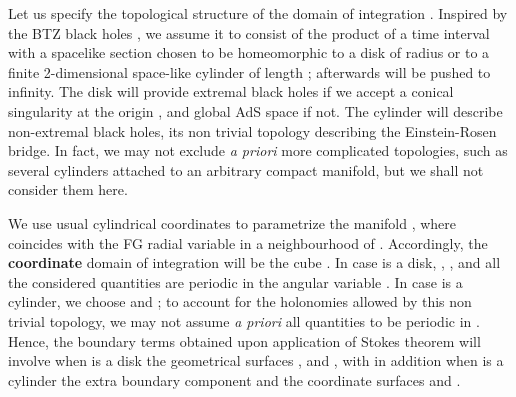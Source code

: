 \documentclass[a4paper,10pt]{article}
\begin{document}
Let us specify the topological structure of the domain of integration \coordHE{}. 
Inspired by the BTZ black holes \cite{BTZ}, we assume it to consist 
of the product of a time interval \myHighlight{$[t_0,\, t_1]$}\coordHE{} with a spacelike 
section \myHighlight{$\Sigma$}\coordHE{} chosen to be homeomorphic to a disk of radius 
\coordHE{} or to a finite 2-dimensional space-like cylinder of length  
\coordHE{}; afterwards \coordHE{} will be pushed to infinity.  
The disk will provide extremal black 
holes if we accept a conical singularity at the 
origin \coordHE{}, and global AdS space if not.  
The cylinder will describe  non-extremal black holes, its 
non trivial topology describing 
the Einstein-Rosen bridge. In fact, we may not 
exclude {\it a priori} 
more complicated topologies, such as several cylinders attached to 
an arbitrary compact manifold, but we shall not consider them here. 
 
We use usual cylindrical coordinates \coordHE{}  
to parametrize the manifold \coordHE{}, where \coordHE{} coincides with the FG  
radial variable in a neighbourhood of \coordHE{}. 
Accordingly, the {\bf coordinate} 
domain of integration will be the cube \coordHE{}.  
In case \myHighlight{$\Sigma$}\coordHE{} is a disk, \coordHE{}, \coordHE{},  
and all the considered quantities 
are periodic in the angular variable \myHighlight{$\varphi$}\coordHE{}.  
In case \myHighlight{$\Sigma$}\coordHE{} is a cylinder, we choose  \coordHE{} and \coordHE{};  
to account for the holonomies allowed by this non trivial 
topology, we may not assume {\it a priori} all quantities  
to be periodic in \myHighlight{$\varphi$}\coordHE{}. Hence, the boundary terms obtained upon  
application of Stokes theorem will involve when \myHighlight{$\Sigma$}\coordHE{} is a disk  
the geometrical surfaces \coordHE{}, \coordHE{} and \coordHE{}, with in addition  
when \myHighlight{$\Sigma$}\coordHE{} is a cylinder the extra boundary  
component \coordHE{} and the coordinate surfaces  
\coordHE{} and \coordHE{}. 
 
\end{document}
